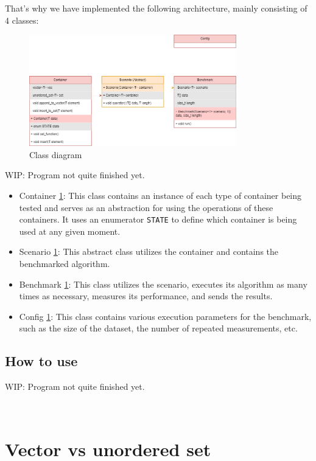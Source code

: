 \documentclass[conference]{IEEEtran}
\def\code#1{\texttt{#1}}
\begin{document}
That's why we have implemented the following architecture, mainly consisting of 4 classes:

\begin{figure}[!h]
	\includegraphics[width=9cm]{Diagram/architecture.png}
	\caption{Class diagram}
	\label{class diagram}
\end{figure}

WIP: Program not quite finished yet.

\begin{itemize}
	\item Container \ref{class diagram}: This class contains an instance of each type of container being tested and serves as an abstraction for using the operations of these containers. It uses an enumerator \code{STATE} to define which container is being used at any given moment.
	\item Scenario \ref{class diagram}: This abstract class utilizes the container and contains the benchmarked algorithm.
	\item Benchmark \ref{class diagram}: This class utilizes the scenario, executes its algorithm as many times as necessary, measures its performance, and sends the results.
	\item Config \ref{class diagram}: This class contains various execution parameters for the benchmark, such as the size of the dataset, the number of repeated measurements, etc.
\end{itemize}

\subsection{How to use}

WIP: Program not quite finished yet.

\begin{lstlisting}
	
\end{lstlisting}

\section{Vector vs unordered set}
\end{document}

